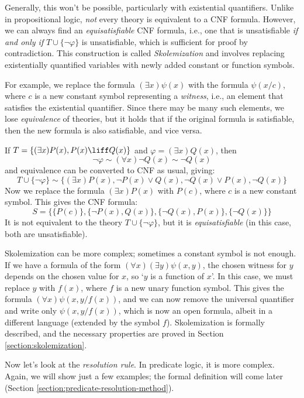 Generally, this won't be possible, particularly with existential quantifiers. Unlike in propositional logic, \emph{not} every theory is equivalent to a CNF formula. However, we can always find an \emph{equisatisfiable} CNF formula, i.e., one that is unsatisfiable \emph{if and only if} $T\cup\{\neg \varphi\}$ is unsatisfiable, which is sufficient for proof by contradiction. This construction is called \emph{Skolemization} and involves replacing existentially quantified variables with newly added constant or function symbols.

For example, we replace the formula $(\exists x)\psi(x)$ with the formula $\psi(x/c)$, where $c$ is a new constant symbol representing a \emph{witness}, i.e., an element that satisfies the existential quantifier. Since there may be many such elements, we lose \emph{equivalence} of theories, but it holds that if the original formula is satisfiable, then the new formula is also satisfiable, and vice versa.

\begin{example}
  If $T=\{(\exists x)P(x),P(x)\liff Q(x)\}$ and $\varphi=(\exists x)Q(x)$, then 
  $$
  \neg\varphi\sim(\forall x)\neg Q(x)\sim\neg Q(x)
  $$
  and equivalence can be converted to CNF as usual, giving:
  $$
  T\cup\{\neg \varphi\}\sim\{(\exists x)P(x),\neg P(x)\lor Q(x),\neg Q(x)\lor P(x),\neg Q(x)\}
  $$
  Now we replace the formula $(\exists x)P(x)$ with $P(c)$, where $c$ is a new constant symbol. This gives the CNF formula:
  $$
  S = \{\{P(c)\},\{\neg P(x),Q(x)\},\{\neg Q(x),P(x)\},\{\neg Q(x)\}\}
  $$
  It is not equivalent to the theory $T\cup\{\neg \varphi\}$, but it is \emph{equisatisfiable} (in this case, both are unsatisfiable).
\end{example}

Skolemization can be more complex; sometimes a constant symbol is not enough. If we have a formula of the form $(\forall x)(\exists y)\psi(x,y)$, the chosen witness for $y$ depends on the chosen value for $x$, so `$y$ is a function of $x$'. In this case, we must replace $y$ with $f(x)$, where $f$ is a new unary function symbol. This gives the formula $(\forall x)\psi(x,y/f(x))$, and we can now remove the universal quantifier and write only $\psi(x,y/f(x))$, which is now an open formula, albeit in a different language (extended by the symbol $f$). Skolemization is formally described, and the necessary properties are proved in Section \ref{section:skolemization}. 

Now let's look at the \emph{resolution rule}. In predicate logic, it is more complex. Again, we will show just a few examples; the formal definition will come later (Section \ref{section:predicate-resolution-method}).

